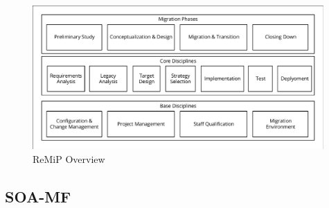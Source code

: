 \begin{figure}
\hypertarget{fig:remip}{%
\centering
\includegraphics[width=0.99\textwidth]{../figures/remip.pdf}
\caption{ReMiP Overview \autocite[adapted from][]{Sneed2010ReMiP}}\label{fig:remip}
}
\end{figure}

\hypertarget{soa-mf}{%
\subsection{SOA-MF}\label{soa-mf}}

